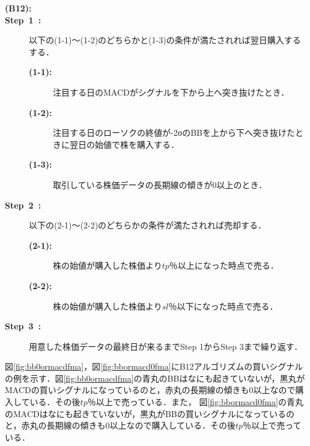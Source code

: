    \begin{description}
    \item[\textbf{(B12):}]
    \item[\textbf{Step~1~:}]以下の(1-1)～(1-2)のどちらかと(1-3)の条件が満たされれば翌日購入するする．
    \begin{description}
      \item[\textbf{(1-1):}]注目する日のMACDがシグナルを下から上へ突き抜けたとき．
      \item[\textbf{(1-2):}]注目する日のローソクの終値が-2σのBBを上から下へ突き抜けたときに翌日の始値で株を購入する．
      \item[\textbf{(1-3):}]取引している株価データの長期線の傾きが0以上のとき． 
     \end{description}  
    
    
    \item[\textbf{Step~2~:}]以下の(2-1)～(2-2)のどちらかの条件が満たされれば売却する．
     \begin{description}
      \item[\textbf{(2-1):}]株の始値が購入した株価より$tp$％以上になった時点で売る．
      \item[\textbf{(2-2):}]株の始値が購入した株価より$sl$％以下になった時点で売る． 
     \end{description}
    \item[\textbf{Step~3~:}]用意した株価データの最終日が来るまでStep 1からStep 3まで繰り返す．
    \end{description}

    

     図\ref{fig:bb0ormacdfma}，図\ref{fig:bbormacd0fma}にB12アルゴリズムの買いシグナルの例を示す．図\ref{fig:bb0ormacdfma}の青丸のBBはなにも起きていないが，黒丸がMACDの買いシグナルになっているのと，赤丸の長期線の傾きも0以上なので購入している．その後$tp$％以上で売っている．また，
     図\ref{fig:bbormacd0fma}の青丸のMACDはなにも起きていないが，黒丸がBBの買いシグナルになっているのと，赤丸の長期線の傾きも0以上なので購入している．その後$tp$％以上で売っている．
 
